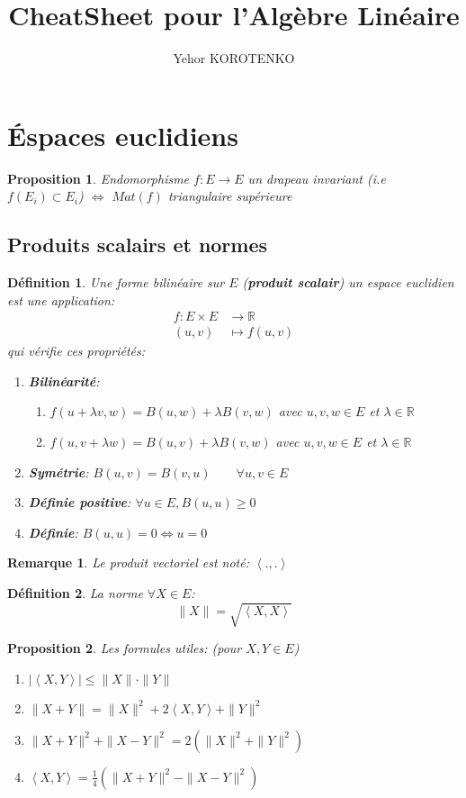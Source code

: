 \documentclass[a4paper]{article}
\author{Yehor KOROTENKO}
\title{CheatSheet pour l'Algèbre Linéaire}
\newcommand{\R}{\mathbb{R}}
\newcommand{\scalair}[1]{\left\langle #1 \right\rangle}
\newtheorem{definition}{Définition}[section]
\newtheorem{prop}{Proposition}[section]
\newtheorem*{remark}{Remarque}
\begin{document}
\maketitle
\section{Éspaces euclidiens}
   \begin{prop}
      Endomorphisme $f: E \to E$ un drapeau invariant (i.e $f(E_i) \subset E_i$) $\iff$ $Mat(f)$ triangulaire supérieure 
   \end{prop} 
\subsection{Produits scalairs et normes}
\begin{definition}
    Une forme bilinéaire sur $E$ (\textbf{produit scalair}) un espace euclidien est une application:
    \begin{align*}
        f: E \times E &\longrightarrow \R \\
        (u, v) &\longmapsto f(u, v) 
    \end{align*}
    qui vérifie ces propriétés:
    \begin{enumerate}
        \item \textbf{Bilinéarité}:
            \begin{enumerate}
                \item $f(u + \lambda v, w) = B(u, w) + \lambda B(v, w)$ avec $u, v, w \in E$ et  $\lambda \in \R$
                \item $f(u, v + \lambda w) = B(u, v) + \lambda B(v, w)$ avec $u, v, w \in E$ et $\lambda \in \R$
            \end{enumerate}
        \item \textbf{Symétrie}: $B(u, v) = B(v, u) \qquad \forall u, v \in E$ 
        \item \textbf{Définie positive}: $\forall u \in E, B(u, u) \ge 0$
        \item \textbf{Définie}: $B(u, u) = 0 \iff u = 0$
    \end{enumerate}
\end{definition}
\begin{remark}
    Le produit vectoriel est noté: $\scalair{., .}$ 
\end{remark}
\begin{definition}
    La norme $\forall X \in E$:
    \[
        \|X\| = \sqrt{\scalair{X, X}} 
    \] 
\end{definition}
\begin{prop}
   Les formules utiles: (pour $X, Y \in E$)
   \begin{enumerate}
       \item $|\scalair{X, Y}| \le \|X\| \cdot \|Y\|$
       \item $\|X + Y\| = \|X\|^2 + 2\scalair{X, Y} + \|Y\|^2$ 
       \item $\|X + Y\|^2 + \|X - Y\|^2 = 2\left( \|X\|^2 + \|Y\|^2 \right) $
       \item $\scalair{X, Y} = \frac{1}{4}\left( \|X + Y\|^2 - \|X - Y\|^2 \right) $
   \end{enumerate}
\end{prop}
\end{document}
